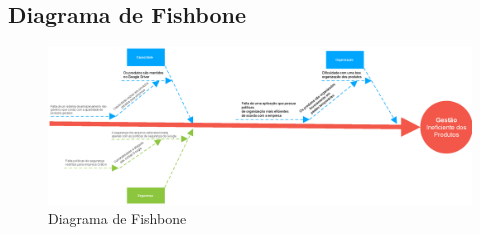 \begin{anexosenv}

  \partanexos

  \chapter{Diagrama de Fishbone}

    \label{fishbone}

    \begin{figure}[!htb]
    \centering
    \includegraphics[width=15cm, keepaspectratio=true]{figuras/anexos/Fishbone.eps}
    \caption{Diagrama de Fishbone}
  \end{figure}
 
\end{anexosenv}

